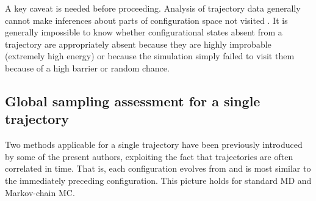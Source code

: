 A key caveat is needed before proceeding.
Analysis of trajectory data generally cannot make inferences about parts of configuration space not visited \cite{Grossfield2009}.
It is generally impossible to know whether configurational states absent from a trajectory are appropriately absent because they are highly improbable (extremely high energy) or because the simulation simply failed to visit them because of a high barrier or random chance.

\subsection{Global sampling assessment for a single trajectory}
Two methods applicable for a single trajectory have been previously introduced by some of the present authors, exploiting the fact that trajectories are often correlated in time.
That is, each configuration evolves from and is most similar to the immediately preceding configuration.
This picture holds for standard MD and Markov-chain MC.

